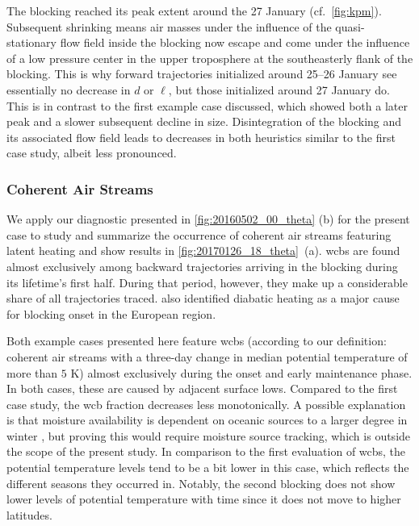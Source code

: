 The blocking reached its peak extent around the 27 January (cf.~\cref{fig:kpm}). Subsequent shrinking means air masses under the influence of the quasi-stationary flow field inside the blocking now escape and come under the influence of a low pressure center in the upper troposphere at the southeasterly flank of the blocking. This is why forward trajectories initialized around 25--26 January see essentially no decrease in $d$ or $\ell$, but those initialized around 27 January do. This is in contrast to the first example case discussed, which showed both a later peak and a slower subsequent decline in size. Disintegration of the blocking and its associated flow field leads to decreases in both heuristics similar to the first case study, albeit less pronounced.

\subsubsection{Coherent Air Streams}

We apply our diagnostic presented in \cref{fig:20160502_00_theta} (b) for the present case to study and summarize the occurrence of coherent air streams featuring latent heating and show results in \cref{fig:20170126_18_theta}~(a). \glspl{wcb} are found almost exclusively among backward trajectories arriving in the blocking during its lifetime's first half. During that period, however, they make up a considerable share of all trajectories traced. \textcite{millerNorthernHemisphereWinter2022} also identified diabatic heating as a major cause for blocking onset in the European region.

Both example cases presented here feature \glspl{wcb} (according to our definition: coherent air streams with a three-day change in median potential temperature of more than $5$ K) almost exclusively during the onset and early maintenance phase. In both cases, these are caused by adjacent surface lows. Compared to the first case study, the \gls{wcb} fraction decreases less monotonically. A possible explanation is that moisture availability is dependent on oceanic sources to a larger degree in winter \parencite{pfahlWarmConveyorBelts2014}, but proving this would require moisture source tracking, which is outside the scope of the present study. In comparison to the first evaluation of \glspl{wcb}, the potential temperature levels tend to be a bit lower in this case, which reflects the different seasons they occurred in. Notably, the second blocking does not show lower levels of potential temperature with time since it does not move to higher latitudes.

